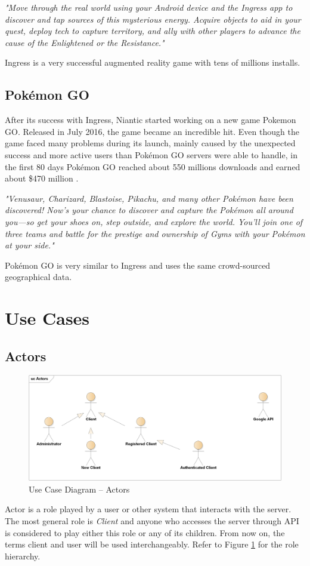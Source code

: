	\textit{"Move through the real world using your Android device and the Ingress app to discover and tap sources of this mysterious energy. Acquire objects to aid in your quest, deploy tech to capture territory, and ally with other players to advance the cause of the Enlightened or the Resistance."} \cite{ingress}
	
	Ingress is a very successful augmented reality game with tens of millions installs.
	
	\subsection{Pokémon GO}
	After its success with Ingress, Niantic started working on a new game Pokemon GO. Released in July 2016, the game became an incredible hit. Even though the game faced many problems during its launch, mainly caused by the unexpected success and more active users than Pokémon	GO servers were able to handle, in the first 80 days Pokémon GO reached about 550 millions downloads and earned about \$470 million \cite{pokemongosuccess}.
	
	\textit{"Venusaur, Charizard, Blastoise, Pikachu, and many other Pokémon have been discovered! Now’s your chance to discover and capture the Pokémon all around you—so get your shoes on, step outside, and explore the world. You’ll join one of three teams and battle for the prestige and ownership of Gyms with your Pokémon at your side."} \cite{pokemongo}
		
	Pokémon GO is very similar to Ingress and uses the same crowd-sourced geographical data.
	
\section{Use Cases}
	\subsection{Actors}
		\begin{figure}[h]	
			\includegraphics[width=\textwidth]{figures/UC_Actors}
			\centering			
			\caption{Use Case
				 Diagram -- Actors}
			\label{fig:ucactors}
		\end{figure}
		\noindent Actor is a role played by a user or other system that interacts with the server. The most general role is \textit{Client} and anyone who accesses the server through API is considered to play either this role or any of its children. From now on, the terms client and user will be used interchangeably. Refer to Figure \ref{fig:ucactors} for the role hierarchy.
		
